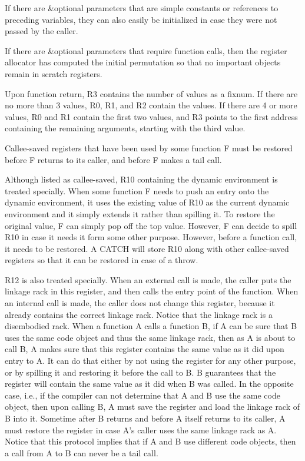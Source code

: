If there are \&optional parameters that are simple constants or
references to preceding variables, they can also easily be
initialized in case they were not passed by the caller. 

If there are \&optional parameters that require function calls, then
the register allocator has computed the initial permutation so that no
important objects remain in scratch registers.  

Upon function return, R3 contains the number of values as a fixnum.
If there are no more than 3 values, R0, R1, and R2 contain the
values. If there are 4 or more values, R0 and R1 contain the first two
values, and R3 points to the first address containing the remaining
arguments, starting with the third value.

Callee-saved registers that have been used by some function F must be
restored before F returns to its caller, and before F makes a tail
call.

Although listed as callee-saved, R10 containing the dynamic
environment is treated specially.  When some function F needs to push
an entry onto the dynamic environment, it uses the existing value of
R10 as the current dynamic environment and it simply extends it rather
than spilling it.  To restore the original value, F can simply pop off
the top value.  However, F can decide to spill R10 in case it needs it
form some other purpose.  However, before a function call, it needs to
be restored.  A CATCH will store R10 along with other callee-saved
registers so that it can be restored in case of a throw.

R12 is also treated specially.  When an external call is made, the
caller puts the linkage rack in this register, and then calls the
entry point of the function.  When an internal call is made, the
caller does not change this register, because it already contains the
correct linkage rack.  Notice that the linkage rack is a
disembodied rack.  When a function A calls a function B, if
A can be sure that B uses the same code object and thus the same
linkage rack, then as A is about to call B, A makes sure that this
register contains the same value as it did upon entry to A.  It can do
that either by not using the register for any other purpose, or by
spilling it and restoring it before the call to B.  B guarantees that
the register will contain the same value as it did when B was called.
In the opposite case, i.e., if the compiler can not determine that A
and B use the same code object, then upon calling B, A must save the
register and load the linkage rack of B into it.  Sometime after B
returns and before A itself returns to its caller, A must restore the
register in case A's caller uses the same linkage rack as A.  Notice
that this protocol implies that if A and B use different code objects,
then a call from A to B can never be a tail call.%

